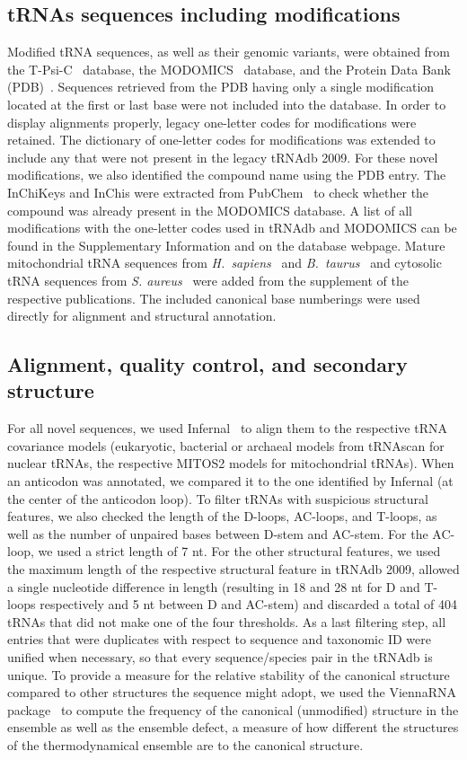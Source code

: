 \documentclass[unnumsec,webpdf,contemporary,large]{oup-authoring-template}
\begin{document}
\subsection{tRNAs sequences including modifications}\label{subsecmodifiedtRNA}
Modified tRNA sequences, as well as their genomic variants, were obtained
from the {T-Psi-C~\cite{tpsic} database, the MODOMICS~\cite{modomics} database,} and the Protein Data Bank
(PDB)~\cite{pdb2000}.  Sequences retrieved from the PDB having only a
single modification located at the first or last base were not included
into the database.  In order to display alignments properly, legacy
one-letter codes for modifications were retained.  The dictionary of
one-letter codes for modifications was extended to include any that were
not present in the legacy tRNAdb 2009.  For these novel modifications, we
also identified the compound name using the PDB entry. The InChiKeys and
InChis were extracted from PubChem~\cite{pubchem2025} to check whether the
compound was already present in the MODOMICS database. A list of all
modifications with the one-letter codes used in tRNAdb and MODOMICS can be
found in the Supplementary Information and on the database webpage.  Mature mitochondrial
tRNA sequences from \emph{H.\ sapiens}~\cite{humanmtRNA} and \emph{B.\
  taurus}~\cite{modtRNAbtaurus} {and cytosolic tRNA sequences from \emph{S. aureus}~\cite{Saureus}} were added from the supplement of the
respective publications. The included canonical base numberings were used
directly for alignment and structural annotation.

\subsection{Alignment, quality control, and secondary structure}
For all novel sequences, we used Infernal~\cite{infernal} to align them to
the respective tRNA covariance models (eukaryotic, bacterial or archaeal
models from tRNAscan for nuclear tRNAs, the respective MITOS2 models for
mitochondrial tRNAs). When an anticodon was annotated, we compared it to
the one identified by Infernal (at the center of the anticodon loop). To
filter tRNAs with suspicious structural features, we also checked the
length of the D-loops, AC-loops, and T-loops, as well as the number of
unpaired bases between D-stem and AC-stem. For the AC-loop, we used a
strict length of 7 nt. For the other structural features, we used the
maximum length of the respective structural feature in tRNAdb 2009, allowed
a single nucleotide difference in length (resulting in 18 and 28 nt for D
and T-loops respectively and 5 nt between D and AC-stem) and discarded a
total of 404 tRNAs that did not make one of the four thresholds. As a last
filtering step, all entries that were duplicates with respect to sequence
and taxonomic ID were unified when necessary, so that every
sequence/species pair in the tRNAdb is unique.
{To provide a measure for the relative stability of the
canonical structure compared to other structures the sequence might
adopt, we used the ViennaRNA package~\cite{viennarna} to compute the
frequency of the canonical (unmodified) structure in the ensemble as well
as the ensemble defect, a measure of how different the structures of the
thermodynamical ensemble are to the canonical structure.}
\end{document}
